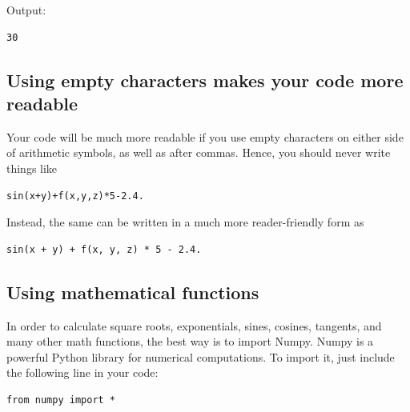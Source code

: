 \documentclass[article,A4,12pt]{llncs}
\begin{document}
\noindent
Output:\\

\begin{ybox}
\begin{verbatim}
30
\end{verbatim}
\end{ybox}
\vspace{6mm}



\subsection{Using empty characters makes your code more readable}
Your code will be much more readable if you use empty
characters on either side of arithmetic symbols, as well as 
after commas. Hence, you should never write things like \\

\begin{bbox}
\begin{verbatim}
sin(x+y)+f(x,y,z)*5-2.4.
\end{verbatim}
\end{bbox}
\vspace{6mm}

\noindent
Instead, the same can be written in a much more reader-friendly form as\\

\begin{bbox}
\begin{verbatim}
sin(x + y) + f(x, y, z) * 5 - 2.4.
\end{verbatim}
\end{bbox}
\vspace{6mm}

\noindent

\subsection{Using mathematical functions}

In order to calculate square roots, exponentials, sines, cosines, tangents, and many other 
math functions, the best way is to import Numpy. Numpy is a powerful Python library 
for numerical computations. To import it, just include the following 
line in your code:\\

\begin{bbox}
\begin{verbatim}
from numpy import *
\end{verbatim}
\end{bbox}
\vspace{6mm}
\end{document}
